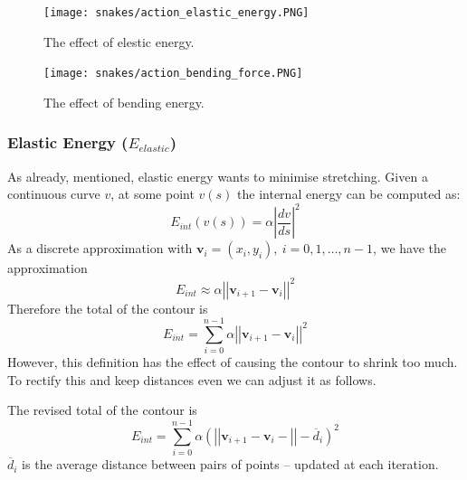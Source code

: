 \documentclass[a4paper]{article}
\begin{document}
\begin{multicols}{2}
\begin{figure}[H]
	\centering %
    	\texttt{[image: snakes/action\_elastic\_energy.PNG]}
    \caption{The effect of elestic energy.}
\end{figure}
\columnbreak
\begin{figure}[H]
	\centering %
    	\texttt{[image: snakes/action\_bending\_force.PNG]}
    \caption{The effect of bending energy.}
\end{figure}
\end{multicols}


\subsubsection{Elastic Energy ($E_{elastic}$)}
As already, mentioned, elastic energy wants to minimise stretching. Given a continuous curve $v$, at some point $v(s)$ the internal energy can be computed as:
\begin{equation}
    E_{int}\left(v(s) \right) = \alpha \left| \frac{dv}{ds} \right|^2
\end{equation}
As a discrete approximation with $\textbf{v}_i = (x_i,y_i),\ i=0,1,\ldots,n-1$, we have the approximation
\begin{equation}
    E_{int} \approx \alpha \left|\left|\textbf{v}_{i+1} - \textbf{v}_i\right|\right|^2
\end{equation}
Therefore the total  of the contour is
\begin{equation*}
    E_{int} = \sum\limits_{i=0}^{n-1}{\alpha \left|\left|\textbf{v}_{i+1} - \textbf{v}_i\right|\right|^2}
\end{equation*}
However, this definition has the effect of causing the contour to shrink too much. To rectify this and keep distances even we can adjust it as follows.
\begin{definition}
The revised total  of the contour is
\begin{equation}
    E_{int} = \sum\limits_{i=0}^{n-1}{ \alpha \left(\left|\left|\textbf{v}_{i+1} - \textbf{v}_i- \right|\right|- \overline{d}_i\right)^2 }
\end{equation}
$\overline{d}_i$ is the average distance between pairs of points – updated at each iteration.
\end{definition}
\end{document}
